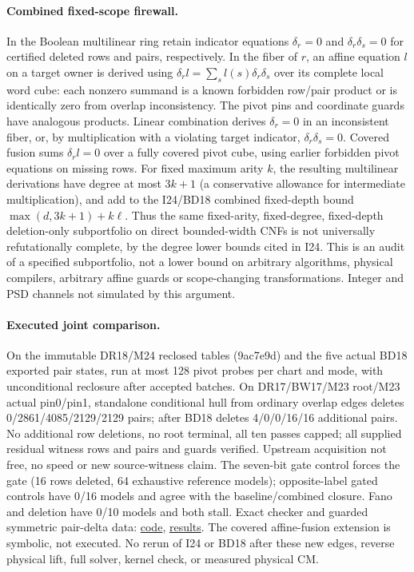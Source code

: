 \documentclass[11pt]{article}
\begin{document}
\paragraph{Combined fixed-scope firewall.} In the Boolean multilinear ring retain indicator equations $\delta_r=0$ and $\delta_r\delta_s=0$ for certified deleted rows and pairs, respectively. In the fiber of $r$, an affine equation $l$ on a target owner is derived using $\delta_r l=\sum_s l(s)\delta_r\delta_s$ over its complete local word cube: each nonzero summand is a known forbidden row/pair product or is identically zero from overlap inconsistency. The pivot pins and coordinate guards have analogous products. Linear combination derives $\delta_r=0$ in an inconsistent fiber, or, by multiplication with a violating target indicator, $\delta_r\delta_s=0$. Covered fusion sums $\delta_r l=0$ over a fully covered pivot cube, using earlier forbidden pivot equations on missing rows. For fixed maximum arity $k$, the resulting multilinear derivations have degree at most $3k+1$ (a conservative allowance for intermediate multiplication), and add to the I24/BD18 combined fixed-depth bound $\max(d,3k+1)+k\ell$. Thus the same fixed-arity, fixed-degree, fixed-depth deletion-only subportfolio on direct bounded-width CNFs is not universally refutationally complete, by the degree lower bounds cited in I24. This is an audit of a specified subportfolio, not a lower bound on arbitrary algorithms, physical compilers, arbitrary affine guards or scope-changing transformations. Integer and PSD channels not simulated by this argument.
\paragraph{Executed joint comparison.} On the immutable DR18/M24 reclosed tables (9ac7e9d) and the five actual BD18 exported pair states, run at most 128 pivot probes per chart and mode, with unconditional reclosure after accepted batches. On DR17/BW17/M23 root/M23 actual pin0/pin1, standalone conditional hull from ordinary overlap edges deletes 0/2861/4085/2129/2129 pairs; after BD18 deletes 4/0/0/16/16 additional pairs. No additional row deletions, no root terminal, all ten passes capped; all supplied residual witness rows and pairs and guards verified. Upstream acquisition not free, no speed or new source-witness claim. The seven-bit gate control forces the gate (16 rows deleted, 64 exhaustive reference models); opposite-label gated controls have 0/16 models and agree with the baseline/combined closure. Fano and deletion have 0/10 models and both stall. Exact checker and guarded symmetric pair-delta data: \href{https://github.com/j15marti/pnp/commit/b15192f292beaafbd9b30aed443447d9f77c1dbd}{code}, \href{https://github.com/j15marti/pnp/commit/ecbbf26c6a5d9b2b53f5942b1889131c3ebe1fce}{results}. The covered affine-fusion extension is symbolic, not executed. No rerun of I24 or BD18 after these new edges, reverse physical lift, full solver, kernel check, or measured physical CM.
\end{document}
